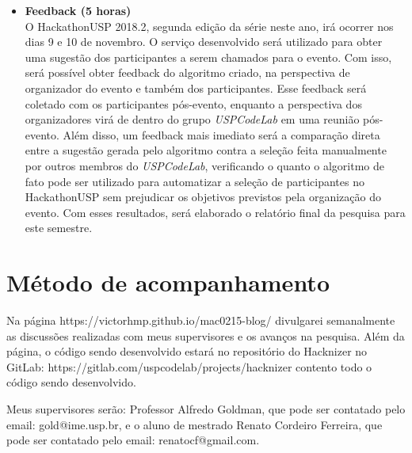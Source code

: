 \documentclass[10pt,twoside,a4paper]{article}
\begin{document}
\begin{itemize}
    \item \textbf{Feedback (5 horas)} \\
        O HackathonUSP 2018.2, segunda edição da série neste ano, irá ocorrer nos dias 9 e 10 de novembro. O serviço desenvolvido será utilizado para obter uma sugestão dos participantes a serem chamados para o evento. Com isso, será possível obter feedback do algoritmo criado, na perspectiva de organizador do evento e também dos participantes. Esse feedback será coletado com os participantes pós-evento, enquanto a perspectiva dos organizadores virá de dentro do grupo \textit{USPCodeLab} em uma reunião pós-evento. Além disso, um feedback mais imediato será a comparação direta entre a sugestão gerada pelo algoritmo contra a seleção feita manualmente por outros membros do \textit{USPCodeLab}, verificando o quanto o algoritmo de fato pode ser utilizado para automatizar a seleção de participantes no HackathonUSP sem prejudicar os objetivos previstos pela organização do evento.
        Com esses resultados, será elaborado o relatório final da pesquisa para este semestre.

  \end{itemize}
  

\section{Método de acompanhamento}

    Na página https://victorhmp.github.io/mac0215-blog/ divulgarei semanalmente as discussões realizadas com meus supervisores e os avanços na pesquisa. Além da página, o código sendo desenvolvido estará no repositório do Hacknizer no GitLab: https://gitlab.com/uspcodelab/projects/hacknizer contento todo o código sendo desenvolvido.
    
    Meus supervisores serão: Professor Alfredo Goldman, que pode ser contatado pelo email: gold@ime.usp.br, e o aluno de mestrado Renato Cordeiro Ferreira, que pode ser contatado pelo email: renatocf@gmail.com.




\end{document}
